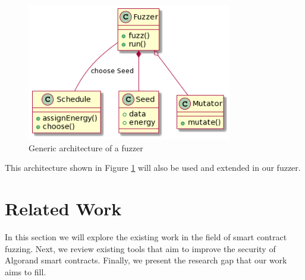 \begin{figure}
    \centering
    \includegraphics[width=0.8\textwidth]{figures/generic-fuzzer-architecture.png}
    \caption{Generic architecture of a fuzzer}\label{fig:generic-fuzzer-architecture}
\end{figure}

This architecture shown in Figure \ref{fig:generic-fuzzer-architecture} will also be used and extended in our fuzzer.

\section{Related Work}
In this section we will explore the existing work in the field of smart contract fuzzing. Next, we review existing tools that aim to improve the security of Algorand smart contracts. Finally, we present the research gap that our work aims to fill.

